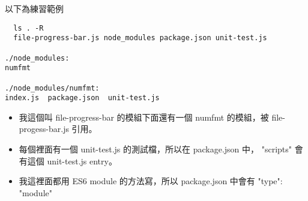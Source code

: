   以下為練習範例
  \begin{verbatim}
  ls . -R
  file-progress-bar.js node_modules package.json unit-test.js

./node_modules:
numfmt

./node_modules/numfmt:
index.js  package.json  unit-test.js
  \end{verbatim}
  \begin{itemize}
    \item 我這個叫 file-progress-bar 的模組下面還有一個 numfmt 的模組，被
      file-progess-bar.js 引用。
    \item 每個裡面有一個 unit-test.js 的測試檔，所以在 package.json 中，
      "scripts" 會有這個 unit-test.js entry。
    \item 我這裡面都用 ES6 module 的方法寫，所以 package.json 中會有
      "type": "module"
  \end{itemize}
